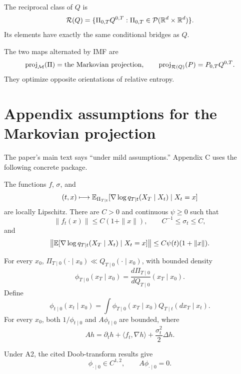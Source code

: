 \begin{definition}[Definition 3]
The reciprocal class of \(Q\) is
\[
 \mathcal R(Q)=\{\Pi_{0,T}Q^{0,T}:\Pi_{0,T}\in\mathcal{P}(\mathbb{R}^d\times\mathbb{R}^d)\}.
\]
Its elements have exactly the same conditional bridges as \(Q\).
\end{definition}

The two maps alternated by IMF are
\[
 \operatorname{proj}_{\mathcal{M}}(\Pi)=\text{the Markovian projection},
 \qquad
 \operatorname{proj}_{\mathcal R(Q)}(P)=P_{0,T}Q^{0,T}.
\]
They optimize opposite orientations of relative entropy.

\section{Appendix assumptions for the Markovian projection}

The paper's main text says ``under mild assumptions.''  Appendix C uses the following concrete package.

\begin{assumption}
The functions \(f\), \(\sigma\), and
\[
 (t,x)\longmapsto
 \mathbb{E}_{\Pi_{T\mid t}}[\nabla\log q_{T\mid t}(X_T\mid X_t)\mid X_t=x]
\]
are locally Lipschitz.  There are \(C>0\) and continuous \(\psi\ge0\) such that
\[
 \|f_t(x)\|\le C(1+\|x\|),
 \qquad
 C^{-1}\le\sigma_t\le C,
\]
and
\[
 \left\|\mathbb{E}[\nabla\log q_{T\mid t}(X_T\mid X_t)\mid X_t=x]\right\|
 \le C\psi(t)(1+\|x\|).
\]
\end{assumption}

\begin{assumption}
For every \(x_0\), \(\Pi_{T\mid0}(\cdot\mid x_0)\ll Q_{T\mid0}(\cdot\mid x_0)\), with bounded density
\[
 \phi_{T\mid0}(x_T\mid x_0)
 =\frac{d\Pi_{T\mid0}}{dQ_{T\mid0}}(x_T\mid x_0).
\]
Define
\begin{equation}
 \phi_{t\mid0}(x_t\mid x_0)
 =\int\phi_{T\mid0}(x_T\mid x_0)Q_{T\mid t}(dx_T\mid x_t).
 \tag{32}\label{eq:DSBM-phi}
\end{equation}
For every \(x_0\), both \(1/\phi_{t\mid0}\) and \(A\phi_{t\mid0}\) are bounded, where
\begin{equation}
 Ah=\partial_th+\langle f_t,\nabla h\rangle+\frac{\sigma_t^2}{2}\Delta h.
 \tag{31}\label{eq:DSBM-generator}
\end{equation}
\end{assumption}

Under A2, the cited Doob-transform results give
\begin{equation}
 \phi_{\cdot\mid0}\in C^{1,2},
 \qquad
 A\phi_{\cdot\mid0}=0.
 \tag{Lemma 11}\label{eq:DSBM-backward-kolm}
\end{equation}

